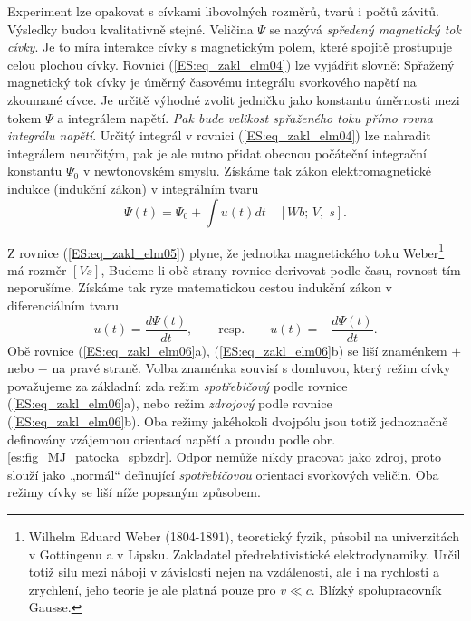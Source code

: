     Experiment lze opakovat s cívkami libovolných rozměrů, tvarů i počtů závitů. Výsledky budou
    kvalitativně stejné. Veličina \(\Psi\) se nazývá \emph{spředený magnetický tok cívky}. Je to
    míra interakce cívky s magnetickým polem, které spojitě prostupuje celou plochou cívky. Rovnici
    (\ref{ES:eq_zakl_elm04}) lze vyjádřit slovně: Spřažený magnetický tok cívky je úměrný časovému
    integrálu svorkového napětí na zkoumané cívce. Je určitě výhodné zvolit jedničku jako konstantu
    úměrnosti mezi tokem \(\Psi\) a integrálem napětí. \emph{Pak bude velikost spřaženého toku přímo
    rovna integrálu napětí}. Určitý integrál v rovnici (\ref{ES:eq_zakl_elm04}) lze nahradit
    integrálem neurčitým, pak je ale nutno přidat obecnou počáteční integrační konstantu \(\Psi_0\)
    v newtonovském smyslu. Získáme tak zákon elektromagnetické indukce (indukční zákon) v
    integrálním tvaru
    \begin{equation}\label{ES:eq_zakl_elm05}
     \Psi(t) = \Psi_0 + \int u(t)dt \quad [Wb;\, V,\; s].
    \end{equation}   
    
    Z rovnice (\ref{ES:eq_zakl_elm05}) plyne, že jednotka magnetického toku Weber\footnote{Wilhelm
    Eduard Weber (1804-1891), teoretický fyzik, působil na univerzitách v Gottingenu a v Lipsku.
    Zakladatel předrelativistické elektrodynamiky. Určil totiž silu mezi náboji v závislosti nejen
    na vzdálenosti, ale i na rychlosti a zrychlení, jeho teorie je ale platná pouze pro \(v \ll c\).
    Blízký spolupracovník Gausse.} má rozměr \([Vs]\), Budeme-li obě strany rovnice derivovat podle
    času, rovnost tím neporušíme. Získáme tak ryze matematickou cestou indukční zákon v
    diferenciálním tvaru
    \begin{equation}\label{ES:eq_zakl_elm06}
     u(t) = \frac{d\Psi(t)}{dt}, \qquad \text{resp.} \qquad  u(t) = -\frac{d\Psi(t)}{dt}.
    \end{equation}   
    Obě rovnice (\ref{ES:eq_zakl_elm06}a), (\ref{ES:eq_zakl_elm06}b) se liší znaménkem \(+\) nebo
    \(-\) na pravé straně. Volba znaménka souvisí s domluvou, který režim cívky považujeme za
    základní: zda režim \emph{spotřebičový} podle rovnice (\ref{ES:eq_zakl_elm06}a), nebo režim
    \emph{zdrojový} podle rovnice (\ref{ES:eq_zakl_elm06}b). Oba režimy jakéhokoli dvojpólu jsou
    totiž jednoznačně definovány vzájemnou orientací napětí a proudu podle obr.
    \ref{es:fig_MJ_patocka_spbzdr}. Odpor nemůže nikdy pracovat jako zdroj, proto slouží jako
    „normál“ definující \emph{spotřebičovou} orientaci svorkových veličin. Oba režimy cívky se liší
    níže popsaným způsobem.

